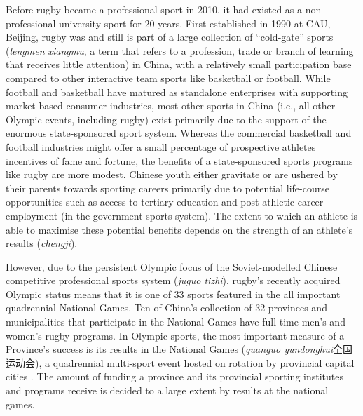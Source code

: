 {Before rugby became a professional sport in 2010, it had existed as a non-professional university sport for 20 years.  First established in 1990 at CAU, Beijing, rugby was and still is part of a large collection of ``cold-gate'' sports (\textit{lengmen xiangmu}, a term that refers to a profession, trade or branch of learning that receives little attention) in China, with a relatively small participation base compared to other interactive team sports like basketball or football.  While football and basketball have matured as standalone enterprises with supporting market-based consumer industries, most other sports in China (i.e., all other Olympic events, including rugby) exist primarily due to the support of the enormous state-sponsored sport system.  Whereas the commercial basketball and football industries might offer a small percentage of prospective athletes incentives of fame and fortune, the benefits of a state-sponsored sports programs like rugby are more modest.  Chinese youth either gravitate or are ushered by their parents towards sporting careers primarily due to potential life-course opportunities such as access to tertiary education and post-athletic career employment (in the government sports system).  The extent to which an athlete is able to maximise these potential benefits depends on the strength of an athlete's results (\textit{chengji}).

However, due to the persistent Olympic focus of the Soviet-modelled Chinese competitive professional sports system (\textit{juguo tizhi}), rugby's recently acquired Olympic status means that it is one of 33 sports featured in the all important quadrennial National Games.  Ten of China's collection of 32 provinces and municipalities that participate in the National Games have full time men's and women's rugby programs.  In Olympic sports, the most important measure of a Province's success is its results in the National Games (\textit{quanguo yundonghui}全国运动会), a quadrennial multi-sport event hosted on rotation by provincial capital cities \citep{Hong2002}.  The amount of funding a province and its provincial sporting institutes and programs receive is decided to a large extent by results at the national games.



}
